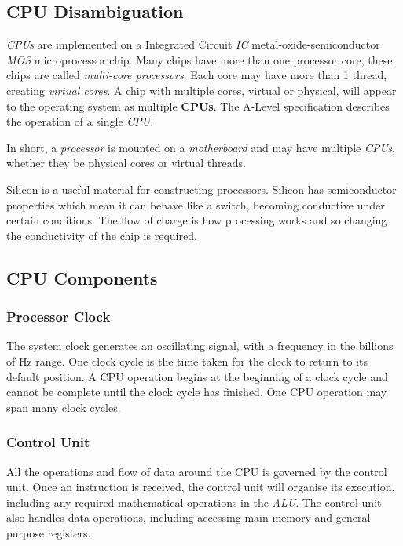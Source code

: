 \documentclass[9pt]{article}
\begin{document}
\subsection{CPU Disambiguation}
\label{sec:org4cd537b}

\emph{CPUs} are implemented on a Integrated Circuit \emph{IC} metal-oxide-semiconductor \emph{MOS} microprocessor chip. Many chips have more than one processor core, these chips are called \emph{multi-core processors}. Each core may have more than 1 thread, creating \emph{virtual cores}. A chip with multiple cores, virtual or physical, will appear to the operating system as multiple \textbf{CPUs}. The A-Level specification describes the operation of a single \emph{CPU}.

In short, a \emph{processor} is mounted on a \emph{motherboard} and may have multiple \emph{CPUs}, whether they be physical cores or virtual threads.

Silicon is a useful material for constructing processors. Silicon has semiconductor properties which mean it can behave like a switch, becoming conductive under certain conditions. The flow of charge is how processing works and so changing the conductivity of the chip is required.

\subsection{CPU Components}
\label{sec:org5cd7f19}
\subsubsection{Processor Clock}
\label{sec:org8bb5d86}

The system clock generates an oscillating signal, with a frequency in the billions of Hz range. One clock cycle is the time taken for the clock to return to its default position. A CPU operation begins at the beginning of a clock cycle and cannot be complete until the clock cycle has finished. One CPU operation may span many clock cycles.

\subsubsection{Control Unit}
\label{sec:orgb931ab9}

All the operations and flow of data around the CPU is governed by the control unit. Once an instruction is received, the control unit will organise its execution, including any required mathematical operations in the \emph{ALU}. The control unit also handles data operations, including accessing main memory and general purpose registers.
\end{document}
